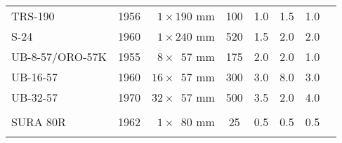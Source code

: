 \begin{twocolumntablefloat}
\begin{twocolumntable}
\begin{tabular}{lrcccccl}
TRS-190         &1956&$\phantom{0}1 \times \phantom{}190$ mm&\phantom{0}100&1.0&1.5&1.0\\
S-24            &1960&$\phantom{0}1 \times \phantom{}240$ mm&\phantom{0}520&1.5&2.0&2.0\\
\addlinespace
UB-8-57/ORO-57K &1955&$\phantom{0}8 \times \phantom{0}57$ mm&\phantom{0}175&2.0&2.0&1.0\\
UB-16-57        &1960&$\phantom{}16 \times \phantom{0}57$ mm&\phantom{0}300&3.0&8.0&3.0\\
UB-32-57        &1970&$\phantom{}32 \times \phantom{0}57$ mm&\phantom{0}500&3.5&2.0&4.0\\
\addlinespace
\midrule
\multicolumn{7}{c}{Spanish Rockets}\\
\midrule
\addlinespace
SURA 80R        &1962&$\phantom{0}1 \times \phantom{0}80$ mm&\phantom{00}25&0.5&0.5&0.5\\
\addlinespace
\bottomrule
\end{tabular}
\end{twocolumntable}
\end{twocolumntablefloat}